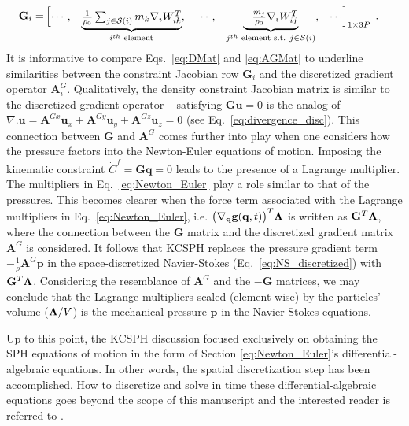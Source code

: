 \begin{align}\renewcommand{\arraystretch}{1.2}
\mathbf{G}_i=& \begin{bmatrix}
\cdots, & 
\smash[b]{\underbrace{\begin{matrix}\frac{1}{\rho_0}\sum_{j \in \support{i}} m_k \nabla_i W_{ik}^T \end{matrix}}_{i^{th}\text{ element} }} ,
&\cdots, &\smash[b]{\underbrace{\begin{matrix}-\frac{m_j}{\rho_0}\nabla_i W_{ij}^T\end{matrix}}_{j^{th}\text{ element s.t. }{j \in \support{i}} }}, & \cdots
\end{bmatrix}_{1\times 3\nParticles} \; . \label{eq:DMat}
\end{align}\\
It is informative to compare Eqs.~\ref{eq:DMat} and \ref{eq:AGMat} to underline similarities between the constraint Jacobian row  $\mathbf{G}_i$ and the discretized gradient operator $\mathbf{A}_i^G$. Qualitatively, the density constraint Jacobian matrix is similar to the discretized gradient operator -- satisfying  $\mathbf{G} \mathbf{u}=0$ is the analog of  $\nabla.\mathbf{u}=\mathbf{A}^{Gx} \mathbf{u}_x+\mathbf{A}^{Gy} \mathbf{u}_y+\mathbf{A}^{Gz}\mathbf{u}_z=0$ (see Eq.~\ref{eq:divergence_disc}). This connection between $\mathbf{G}$ and $\mathbf{A}^G$ comes further into play when one considers how the pressure factors into the Newton-Euler equations of motion. Imposing the kinematic constraint $\dot{C}^f=\mathbf{G} \mathbf{\dot{q}}=0$ leads to the presence of a Lagrange multiplier. The multipliers in Eq.~\ref{eq:Newton_Euler} play a role similar to that of the pressures. This becomes clearer when the force term associated with the Lagrange multipliers in Eq.~\ref{eq:Newton_Euler}, i.e. $\big(\nabla_{\bf q} {\bf g}({\bf q},t)\big)^T \bf{\Lambda}$ is written as $\mathbf{G}^T \bf{\Lambda}$, where the connection between the $\mathbf{G}$ matrix and the discretized gradient matrix $\mathbf{A}^G$ is considered. It follows that KCSPH replaces the pressure gradient term $-\frac{1}{\rho} \mathbf{A}^{G}\mathbf{p}$ in the space-discretized Navier-Stokes (Eq.~\ref{eq:NS_discretized}) with $\mathbf{G}^T \bf{\Lambda}$. Considering the resemblance of $\mathbf{A}^{G}$ and the $-\mathbf{G}$ matrices, we may conclude that the Lagrange multipliers scaled (element-wise)  by the particles' volume (${\bf\Lambda}/V$) is the mechanical pressure $\mathbf{p}$ in the Navier-Stokes equations. 

Up to this point, the KCSPH discussion focused exclusively on obtaining the SPH equations of motion in the form of Section \ref{eq:Newton_Euler}'s differential-algebraic equations. In other words, the spatial discretization step has been accomplished. How to discretize and solve in time these differential-algebraic equations goes beyond the scope of this manuscript and the interested reader is referred to \cite{hammadConstrFluid2018}.

